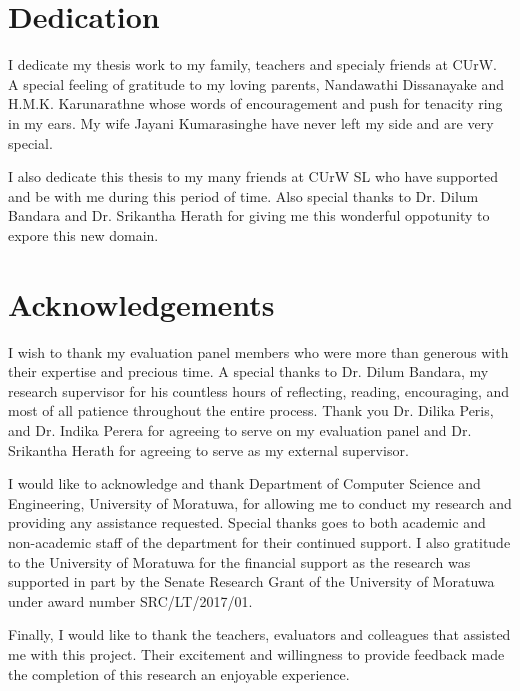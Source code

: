 \documentclass[a4paper,oneside,12pt]{report}
\begin{document}
\chapter*{Dedication}
I dedicate my thesis work to my family, teachers and specialy friends at CUrW. A special feeling of gratitude to my loving parents, Nandawathi Dissanayake and H.M.K. Karunarathne whose words of encouragement and push for tenacity ring in my ears. My wife Jayani Kumarasinghe have never left my side and are very special.

I also dedicate this thesis to my many friends at CUrW SL who have supported and be with me during this period of time. Also special thanks to Dr. Dilum Bandara and Dr. Srikantha Herath for giving me this wonderful oppotunity to expore this new domain.

\chapter*{Acknowledgements}
I wish to thank my evaluation panel members who were more than generous with their expertise and precious time. A special thanks to Dr. Dilum Bandara, my research supervisor for his countless hours of reflecting, reading, encouraging, and most of all patience throughout the entire process. Thank you Dr. Dilika Peris, and Dr. Indika Perera for agreeing to serve on my evaluation panel and Dr. Srikantha Herath for agreeing to serve as my external supervisor.

I would like to acknowledge and thank Department of Computer Science and Engineering, University of Moratuwa, for allowing me to conduct my research and providing any assistance requested. Special thanks goes to both academic and non-academic staff of the department for their continued support. I also gratitude to the University of Moratuwa for the financial support as the research was supported in part by the Senate Research Grant of the University of Moratuwa under award number SRC/LT/2017/01.

Finally, I would like to thank the teachers, evaluators and colleagues that assisted me with this project. Their excitement and willingness to provide feedback made the completion of this research an enjoyable experience.

\tableofcontents

\listoffigures

\listoftables
\end{document}
